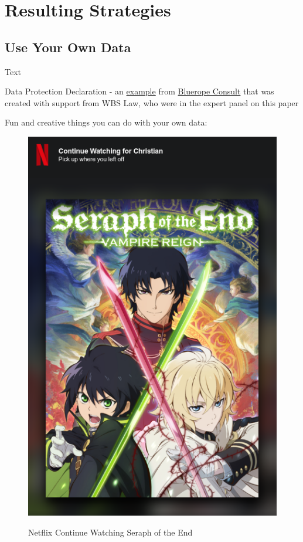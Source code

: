 %
%

\pagebreak
\section{Resulting Strategies}

\onehalfspacing

\subsection{Use Your Own Data}

Text

Data Protection Declaration - an \href{https://blueropeconsultonline.de/datenschutz/}{example} from \href{https://blueropeconsultonline.de/}{Bluerope Consult} that was created with support from WBS Law, who were in the expert panel on this paper

Fun and creative things you can do with your own data:

\begin{figure}[H]
\centering
\caption {Netflix Continue Watching Seraph of the End}
\includegraphics[scale=0.6]{images/continue-seraph.png}
\label{fig:seraph}
\end{figure}

